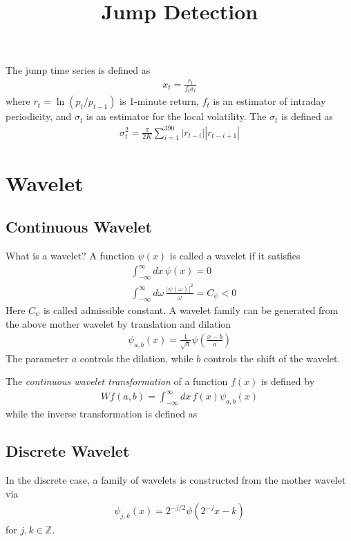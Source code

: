 \documentclass[11pt,a4paper]{article}
\begin{document}
\title{Jump Detection}
\maketitle

The jump time series is defined as
\begin{align}
x_t
= 
\frac{r_t}{f_t \sigma_t}
\end{align}
where $r_t = \ln( p_t / p_{t-1})$ is 1-minute return, $f_t$ is an estimator of intraday periodicity, and $\sigma_t$ is an estimator for the local volatility. The $\sigma_t$ is defined as
\begin{align}
\sigma_t^2
= \frac{\pi}{2 K}
\sum_{i=1}^{390} 
|r_{t-i}| |r_{t-i+1}|
\end{align}


\section{Wavelet}
\subsection{Continuous Wavelet}
What is a wavelet? A function $\psi(x)$ is called a wavelet if it satisfies
\begin{align}
&
\int_{-\infty}^{\infty} dx \, \psi(x)  = 0
\\
&
\int_{-\infty}^{\infty} d\omega \, \frac{|\psi(\omega)|^2}{\omega} = C_\psi < 0
\end{align}
Here $C_\psi$ is called admissible constant. A wavelet family can be generated from the above mother wavelet by translation and dilation
\begin{align}
\psi_{a,b}(x) 
= \frac{1}{\sqrt{a}} \psi \left( \frac{x - b}{a} \right)
\end{align}
The parameter $a$ controls the dilation, while $b$ controls the shift of the wavelet. 

The {\it continuous wavelet transformation} of a function $f(x)$ is defined by
\begin{align}
W f(a,b) = \int_{-\infty}^\infty dx \, f(x) \psi_{a,b} (x)
\end{align}
while the inverse transformation is defined as


\subsection{Discrete Wavelet}
In the discrete case, a family of wavelets is constructed from the mother wavelet via
\begin{align}
\psi_{j,k}(x) = 2^{-j / 2} \psi( 2^{-j} x - k)
\end{align}
for $j, k \in {\mathbb Z}$. 





\end{document}
